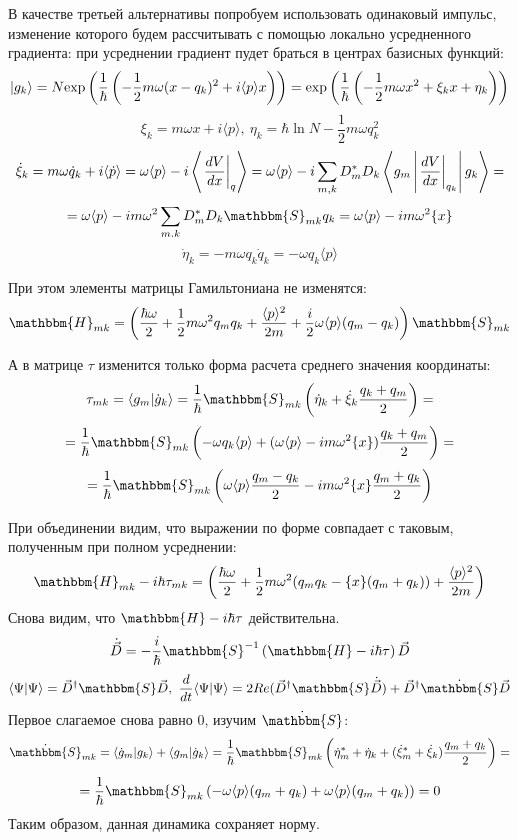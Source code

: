 В качестве третьей альтернативы попробуем использовать одинаковый импульс, %
изменение которого будем рассчитывать с помощью локально усредненного градиента:
при усреднении градиент пудет браться в центрах базисных функций:
$$|g_k\rangle=%
  N\myexp{\frac{1}{\hbar}\left(-\frac{1}{2}m\omega(x-q_k)^2+i\langle p\rangle x\right)}=%
  \myexp{\frac{1}{\hbar}\left(-\frac{1}{2}m\omega x^2 + \xi_k x + \eta_k\right)}$$
$$\xi_k = m\omega x + i\langle p\rangle,\ \eta_k = \hbar\ln N - \frac{1}{2}m\omega q_k^2$$
$$\dot{\xi}_k=m\omega\dot{q}_k+i\langle\dot{p}\rangle = %
              \omega\langle p\rangle - i \left\langle\left.\frac{dV}{dx}\right|_q\right\rangle=%
	      \omega\langle p\rangle - i\sum_{m,k}D_m^*D_k\mymean{g_m}{\left.\frac{dV}{dx}\right|_{q_k}}{g_k}=$$
$$=\omega\langle p\rangle - im\omega^2\sum_{m.k}D_m^*D_k\mathbbm{S}_{mk}q_k = %
   \omega\langle p\rangle - im\omega^2 \{x\}$$
$$\dot{\eta}_k = -m\omega q_k\dot{q}_k = -\omega q_k\langle p\rangle$$

При этом элементы матрицы Гамильтониана не изменятся:
$$\mathbbm{H}_{mk} = \left(\frac{\hbar\omega}{2} + %
			   \frac{1}{2}m\omega^2q_mq_k + %
			   \frac{\langle p\rangle^2}{2m} + %
			   \frac{i}{2}\omega\langle p\rangle(q_m-q_k)\right)\mathbbm{S}_{mk}$$

А в матрице $\tau$ изменится только форма расчета среднего значения координаты:
$$\tau_{mk}=\myint{g_m}{\dot{g}_k} = %
	    \frac{1}{\hbar}\mathbbm{S}_{mk}\left(\dot{\eta}_k+%
						 \dot{\xi}_k\frac{q_k+q_m}{2}\right) = $$
$$=\frac{1}{\hbar}\mathbbm{S}_{mk}\left(-\omega q_k\langle p\rangle + %
                          (\omega\langle p\rangle-im\omega^2\{x\})\frac{q_k+q_m}{2}\right) = $$
$$=\frac{1}{\hbar}\mathbbm{S}_{mk}\left(\omega\langle p\rangle\frac{q_m-q_k}{2} - %
			 im\omega^2\{x\}\frac{q_m+q_k}{2}\right)$$

При объединении видим, что выражении по форме совпадает с таковым, полученным при полном усреднении:
$$\mathbbm{H}_{mk}-i\hbar\tau_{mk} = %
  \left(\frac{\hbar\omega}{2} + %
	\frac{1}{2}m\omega^2(q_mq_k-\{x\}(q_m+q_k)) + %
	\frac{\langle p\rangle^2}{2m}\right)$$
Снова видим, что $\mathbbm{H}-i\hbar\tau$ действительна. 
$$\dot{\vec{D}} = -\frac{i}{\hbar}\mathbbm{S}^{-1}\left(\mathbbm{H}-i\hbar\tau\right)\vec{D}$$
$$\myint{\Psi}{\Psi} = \vec{D}^{\dagger}\mathbbm{S}\vec{D},\ %
  \frac{d}{dt}\myint{\Psi}{\Psi} = 2Re(\vec{D}^{\dagger}\mathbbm{S}\dot{\vec{D}})+%
				   \vec{D}^{\dagger}\dot{\mathbbm{S}}\vec{D}$$
Первое слагаемое снова равно $0$, изучим $\dot{\mathbbm{S}}$:
$$\dot{\mathbbm{S}}_{mk} = \myint{\dot{g}_m}{g_k}+\myint{g_m}{\dot{g}_k} = %
  \frac{1}{\hbar}\mathbbm{S}_{mk}\left(\dot{\eta}_m^*+\dot{\eta}_k+%
					(\dot{\xi}_m^*+\dot{\xi}_k)\frac{q_m+q_k}{2}\right)=$$
$$= \frac{1}{\hbar}\mathbbm{S}_{mk}\left(-\omega\langle p\rangle(q_m+q_k) + %
					  \omega\langle p\rangle(q_m+q_k)\right) = 0$$
Таким образом, данная динамика сохраняет норму.
